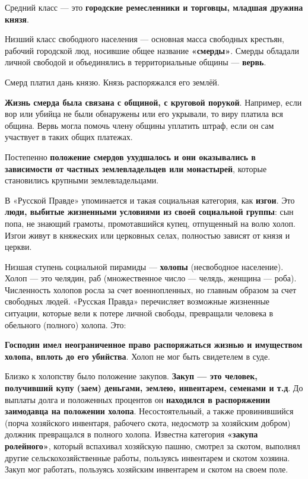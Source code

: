 \documentclass{article}
\begin{document}
\hfill

Средний класс — это \textbf{городские ремесленники и торговцы, младшая дружина князя}.

\hfill

Низший класс свободного населения — основная масса свободных крестьян, рабочий городской люд, носившие общее название \textbf{«смерды»}. Смерды обладали личной свободой и объединялись в территориальные общины — \textbf{вервь}.

Смерд платил дань князю. Князь распоряжался его землёй.

\textbf{Жизнь смерда была связана с общиной, с круговой порукой}. Например, если вор или убийца не были обнаружены или его укрывали, то виру платила вся община. Вервь могла помочь члену общины уплатить штраф, если он сам участвует в таких общих платежах.

Постепенно \textbf{положение смердов ухудшалось и они оказывались в зависимости от частных землевладельцев или монастырей}, которые становились крупными землевладельцами.

\hfill

В «Русской Правде» упоминается и такая социальная категория, как \textbf{изгои}. Это \textbf{люди, выбитые жизненными условиями из своей социальной группы}: сын попа, не знающий грамоты, промотавшийся купец, отпущенный на волю холоп. Изгои живут в княжеских или церковных селах, полностью зависят от князя и церкви.

\hfill

Низшая ступень социальной пирамиды — \textbf{холопы} (несвободное население). Холоп — это челядин, раб (множественное число — челядь, женщина — роба). Численность холопов росла за счет военнопленных, но главным образом за счет свободных людей. «Русская Правда» перечисляет возможные жизненные ситуации, которые вели к потере личной свободы, превращали человека в обельного (полного) холопа. Это:

\begin{multienumerate}
\end{multienumerate}

\textbf{Господин имел неограниченное право распоряжаться жизнью и имуществом холопа, вплоть до его убийства}. Холоп не мог быть свидетелем в суде.

\hfill

Близко к холопству было положение закупов. \textbf{Закуп — это человек, получивший купу (заем) деньгами, землею, инвентарем, семенами и т.д}. До выплаты долга и положенных процентов он \textbf{находился в распоряжении заимодавца на положении холопа}. Несостоятельный, а также провинившийся (порча хозяйского инвентаря, рабочего скота, недосмотр за хозяйским добром) должник превращался в полного холопа. Известна категория \textbf{«закупа ролейного»}, который вспахивал хозяйскую пашню, смотрел за скотом, выполнял другие сельскохозяйственные работы, пользуясь инвентарем и скотом хозяина. Закуп мог работать, пользуясь хозяйским инвентарем и скотом на своем поле.
\end{document}
